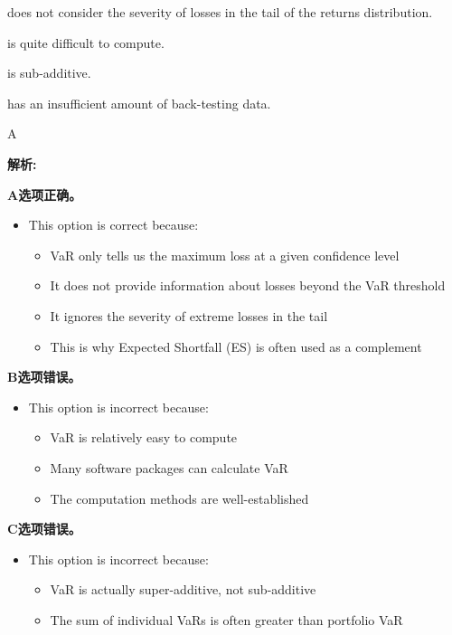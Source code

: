 \documentclass{article}
\newenvironment{explanation}
{\textbf{解析:}\par}
{\par}
\begin{document}
\begin{choices}
    \item does not consider the severity of losses in the tail of the returns distribution.
    \item is quite difficult to compute.
    \item is sub-additive.
    \item has an insufficient amount of back-testing data.
\end{choices}

\begin{correctanswer}
    A
\end{correctanswer}

\begin{explanation}
    \textbf{A选项正确。}
    \begin{itemize}
        \item This option is correct because:
        \begin{itemize}
            \item VaR only tells us the maximum loss at a given confidence level
            \item It does not provide information about losses beyond the VaR threshold
            \item It ignores the severity of extreme losses in the tail
            \item This is why Expected Shortfall (ES) is often used as a complement
        \end{itemize}
    \end{itemize}
    \textbf{B选项错误。}
    \begin{itemize}
        \item This option is incorrect because:
        \begin{itemize}
            \item VaR is relatively easy to compute
            \item Many software packages can calculate VaR
            \item The computation methods are well-established
        \end{itemize}
    \end{itemize}
    \textbf{C选项错误。}
    \begin{itemize}
        \item This option is incorrect because:
        \begin{itemize}
            \item VaR is actually super-additive, not sub-additive
            \item The sum of individual VaRs is often greater than portfolio VaR

\end{itemize}
\end{itemize}
\end{explanation}
\end{document}
